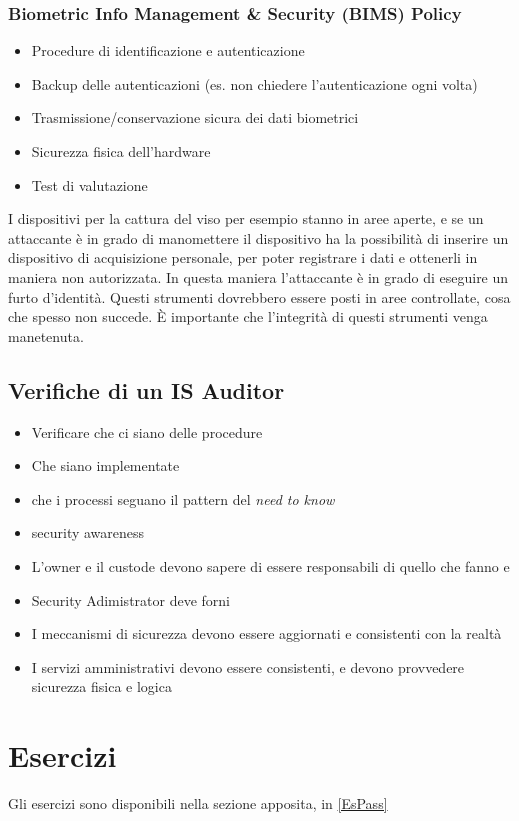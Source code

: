 \subsubsection{Biometric Info Management \& Security (BIMS) Policy}

\begin{itemize}
 \item Procedure di identificazione e autenticazione
 \item Backup delle autenticazioni (es. non chiedere l'autenticazione ogni
 volta)
 \item Trasmissione/conservazione sicura dei dati biometrici
 \item Sicurezza fisica dell'hardware
 \item Test di valutazione
\end{itemize}

I dispositivi per la cattura del viso per esempio stanno in aree aperte, e se
un attaccante è in grado di manomettere il dispositivo ha la possibilità di
inserire un dispositivo di acquisizione personale, per poter registrare i dati
e ottenerli in maniera non autorizzata. In questa maniera l'attaccante è in
grado di eseguire un furto d'identità. Questi strumenti dovrebbero essere posti
in aree controllate, cosa che spesso non succede. È importante che l'integrità
di questi strumenti venga manetenuta.

\subsection{Verifiche di un IS Auditor}
\begin{itemize}
 \item Verificare che ci siano delle procedure
 \item Che siano implementate
 \item che i processi seguano il pattern del \textit{need to know}
 \item security awareness
 \item L'owner e il custode devono sapere di essere responsabili di quello che
 fanno e
 \item Security Adimistrator deve forni
 \item I meccanismi di sicurezza devono essere aggiornati e consistenti con la
 realtà
 \item I servizi amministrativi devono essere consistenti, e devono provvedere
 sicurezza fisica e logica
\end{itemize}

\section{Esercizi}

Gli esercizi sono disponibili nella sezione apposita, in \ref{EsPass}
